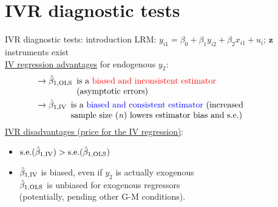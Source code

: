\documentclass[usenames,dvipsnames]{beamer}
\begin{document}
\section{IVR diagnostic tests}
\begin{frame}{IVR diagnostic tests: introduction}
LRM: $y_{i1}=\beta_0+\beta_1 y_{i2}+\beta_2 x_{i1}+u_i$; \quad $\bm{z}$ instruments exist \\
\vspace{0.3cm}
\underline{IV regression advantages} for endogenous $y_2$:
\vspace{-0.2cm}
\begin{align*}
& \rightarrow \hat{\beta}_{1,\textnormal{OLS}} \enspace \parbox[t]{24em}{ is a \textcolor{red}{biased and inconsistent estimator} \\(asymptotic errors)}\\
 & \rightarrow \hat{\beta}_{1, \textnormal{IV}} \enspace \parbox[t]{24em}{ is a \textcolor{blue}{biased and consistent estimator} (increased \\sample size (\textit{n}) lowers estimator bias and s.e.)} 
\end{align*}
\underline{IVR disadvantages (price for the IV regression)}:
\begin{itemize}
\item $\textnormal{s.e.}(\hat{\beta}_{1, \textnormal{IV}}) > \textnormal{s.e.}(\hat{\beta}_{1,\textnormal{OLS}})$
\item $\hat{\beta}_{1, \textnormal{IV}}$ is biased, even if $y_2$ is actually exogenous\\
\smallskip
$\hat{\beta}_{1, \textnormal{OLS}}$ is unbiased for exogenous regressors \\ 
\small (potentially, pending other G-M conditions).
\end{itemize}
\end{frame}
\end{document}
